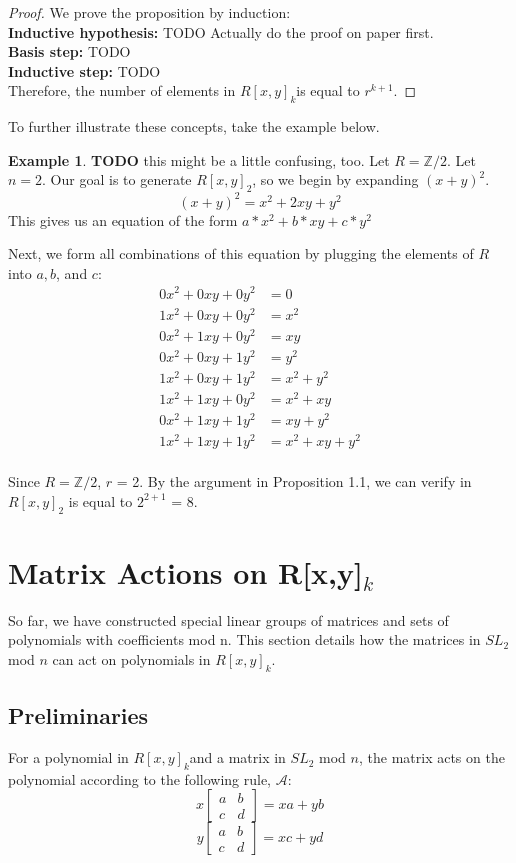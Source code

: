 \documentclass[a4paper,draft]{amsproc}
\theoremstyle{plain}
\theoremstyle{definition}
\newtheorem{exm}{Example}[section]
\theoremstyle{remark}
\numberwithin{equation}{section}
\begin{document}
\begin{proof}
We prove the proposition by induction: \\
\textbf{Inductive hypothesis: } TODO Actually do the proof on paper first. \\
\textbf{Basis step: } TODO \\
\textbf{Inductive step:} TODO \\

Therefore, the number of elements in $R[x,y]_{k}$is equal to $r^{k + 1}$. 
\end{proof}
To further illustrate these concepts, take the example below. 
\begin{exm}
\textbf{TODO} this might be a little confusing, too. 
Let $R = \mathbb{Z}/2$.  Let $n = 2$. Our goal is to generate $R[x,y]_{2}$, so we begin by expanding $(x + y)^{2}$. 
$$(x + y)^{2} = x^{2} + 2xy + y^{2} $$
This gives us an equation of the form $a*x^{2} + b*xy + c*y^{2} $

Next, we form all combinations of this equation by plugging the elements of $R$ into $a, b$, and $c$: 
\begin{align*}
0x^{2} + 0xy + 0y^{2} &= 0 \\
1x^{2} + 0xy + 0y^{2} &= x^{2} \\
0x^{2} +1xy + 0y^{2}  &= xy \\
0x^{2} + 0xy + 1y^{2} &= y^{2} \\
1x^{2} + 0xy + 1y^{2} &= x^{2} + y^{2} \\
1x^{2} + 1xy + 0y^{2} &= x^{2} + xy \\
0x^{2} + 1xy + 1y^{2} &= xy + y^{2} \\
1x^{2} + 1xy + 1y^{2}  &= x^{2} + xy + y^{2}\\
\end{align*}

Since  $R = \mathbb{Z}/2$, $r$ = 2. By the argument in Proposition 1.1, we can verify  in $R[x,y]_{2}$ is equal to $2^{2 + 1}$ = 8.
\end{exm}

\section{Matrix Actions on R[x,y]$_{k}$} 
So far, we have constructed special linear groups of matrices and sets of polynomials with coefficients mod n. This section details how the matrices in $SL_{2}$ mod $n$ can act on polynomials in $R[x,y]_{k}$. 

\subsection{Preliminaries}
For a polynomial in $R[x,y]_{k}$and a matrix in $SL_{2}$ mod $n$, the matrix acts on the polynomial according to the following rule, $\mathcal{A}$: 
$$
x\begin{bmatrix}
 a&b \\ 
 c&d 
\end{bmatrix} = xa + yb 
$$
$$
y\begin{bmatrix}
 a&b \\ 
 c&d 
\end{bmatrix} = xc + yd 
$$
\end{document}
